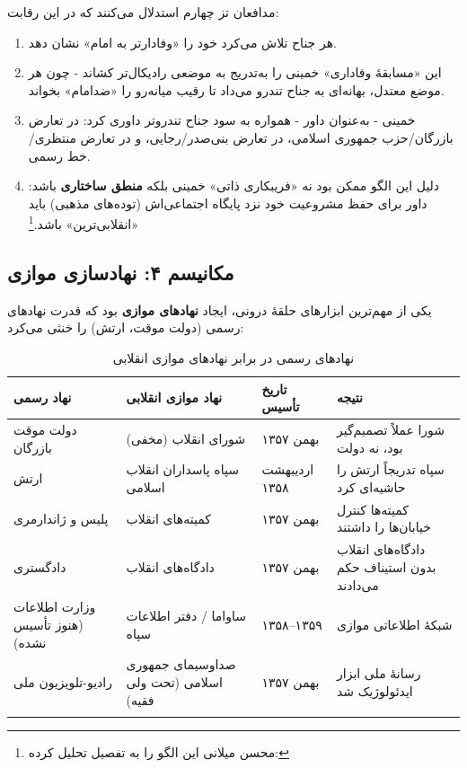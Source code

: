 \documentclass[12pt,a4paper]{book}
\newcommand{\keyword}[1]{\textbf{\textcolor{cPrimary}{#1}}}
\newcommand{\en}[1]{\lr{\textit{#1}}}
\begin{document}
مدافعان تز چهارم استدلال می‌کنند که در این رقابت:

\begin{enumerate}[label=\textcolor{cConsolid}{\bfseries\arabic*.}, rightmargin=2em]
    \item هر جناح تلاش می‌کرد خود را «وفادارتر به امام» نشان دهد.
    \item این «مسابقهٔ وفاداری» خمینی را به‌تدریج به موضعی رادیکال‌تر کشاند - چون هر موضع معتدل، بهانه‌ای به جناح تندرو می‌داد تا رقیب میانه‌رو را «ضدامام» بخواند.
    \item خمینی - به‌عنوان داور - همواره به سود جناح تندروتر داوری کرد: در تعارض بازرگان/حزب جمهوری اسلامی، در تعارض بنی‌صدر/رجایی، و در تعارض منتظری/خط رسمی.
    \item دلیل این الگو ممکن بود نه «فریبکاری ذاتی» خمینی بلکه \keyword{منطق ساختاری} باشد: داور برای حفظ مشروعیت خود نزد پایگاه اجتماعی‌اش (توده‌های مذهبی) باید «انقلابی‌ترین» باشد.\footnote{محسن میلانی این الگو را به تفصیل تحلیل کرده: \en{Milani (1994), pp.\,140--175.}}
\end{enumerate}

\subsection{مکانیسم ۴: نهادسازی موازی}

یکی از مهم‌ترین ابزارهای حلقهٔ درونی، ایجاد \keyword{نهادهای موازی} بود که قدرت نهادهای رسمی (دولت موقت، ارتش) را خنثی می‌کرد:

\begin{longtable}{%
    >{\raggedleft\arraybackslash}p{}
    >{\raggedleft\arraybackslash}p{}
    >{\raggedleft\arraybackslash}p{}
    >{\raggedleft\arraybackslash}p{}}
\toprule
\rowcolor{cConsolid!10}
\textbf{نهاد رسمی} & \textbf{نهاد موازی انقلابی} & \textbf{تاریخ تأسیس} & \textbf{نتیجه} \\
\midrule
\endhead

دولت موقت بازرگان &
شورای انقلاب (مخفی) &
بهمن ۱۳۵۷ &
شورا عملاً تصمیم‌گیر بود، نه دولت \\
\midrule

ارتش &
سپاه پاسداران انقلاب اسلامی &
اردیبهشت ۱۳۵۸ &
سپاه تدریجاً ارتش را حاشیه‌ای کرد \\
\midrule

پلیس و ژاندارمری &
کمیته‌های انقلاب &
بهمن ۱۳۵۷ &
کمیته‌ها کنترل خیابان‌ها را داشتند \\
\midrule

دادگستری &
دادگاه‌های انقلاب &
بهمن ۱۳۵۷ &
دادگاه‌های انقلاب بدون استیناف حکم می‌دادند \\
\midrule

وزارت اطلاعات (هنوز تأسیس نشده) &
ساواما / دفتر اطلاعات سپاه &
۱۳۵۸–۱۳۵۹ &
شبکهٔ اطلاعاتی موازی \\
\midrule

رادیو-تلویزیون ملی &
صداوسیمای جمهوری اسلامی (تحت ولی فقیه) &
بهمن ۱۳۵۷ &
رسانهٔ ملی ابزار ایدئولوژیک شد \\

\bottomrule
\caption{نهادهای رسمی در برابر نهادهای موازی انقلابی}
\label{tab:parallel-institutions}
\end{longtable}
\end{document}
